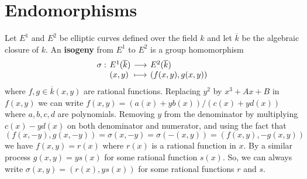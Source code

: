 \section{Endomorphisms}
Let $E^1$ and $E^2$ be elliptic curves defined over the field $k$ and let $\overline{k}$ be the 
algebraic closure of $k$. An \textbf{isogeny} from $E^1$ to $E^2$ is a group homomorphism
$$
\setlength\arraycolsep{2pt}
\begin{array}{llll}
\sigma: & E^1(\overline{k}) & \longrightarrow & E^2(\overline{k}) \\
& (x, y) & \longmapsto & (f(x, y), g(x, y))
\end{array}
$$
where $f, g \in \overline{k}(x, y)$ are rational functions. Replacing $y^2$ by $x^3 + Ax + B$ in 
$f(x, y)$ we can write $f(x, y) = (a(x) + yb(x)) / (c(x) + yd(x))$ where $a, b, c, d$ are 
polynomials. Removing $y$ from the denominator by multiplying $c(x) - yd(x)$ on both denominator and 
numerator, and using the fact that $(f(x, -y), g(x, -y)) = \sigma(x, -y) = \sigma(-(x, y)) = (f(x, 
y), -g(x, y))$ we have $f(x, y) = r(x)$ where $r(x)$ is a rational function in $x$. By a similar 
process $g(x, y) = ys(x)$ for some rational function $s(x)$. So, we can always write $\sigma(x, y) = 
(r(x), ys(x))$ for some rational functions $r$ and $s$.

